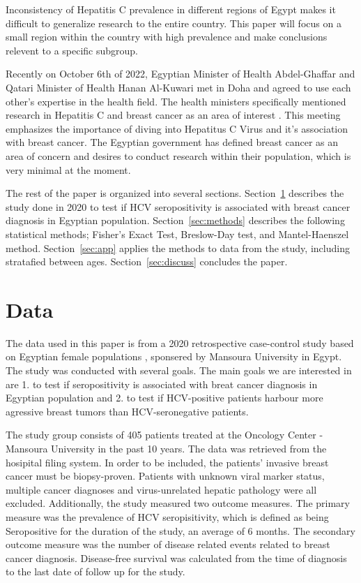 \documentclass[12pt, titlepage]{article}
\begin{document}
Inconsistency of Hepatitis C prevalence in different regions of Egypt makes 
it difficult to generalize research to the entire country. This paper will 
focus on a small region within the country with high 
prevalence \citep{Hussein2021high} and make conclusions relevent to a specific 
subgroup. 

Recently on October 6th of 2022, Egyptian Minister of Health Abdel-Ghaffar and 
Qatari Minister of Health Hanan Al-Kuwari met in Doha and agreed to use each 
other's expertise in the health field. The health ministers specifically mentioned research 
in Hepatitis C and breast cancer as an area of interest \citep{arham2022egypt}. 
This meeting emphasizes the importance of diving into Hepatitus C Virus 
and it's association with breast cancer. The Egyptian government has defined 
breast cancer as an area of concern and desires to conduct research within their 
population, which is very minimal at the moment. 

The rest of the paper is organized into several sections. Section~\ref{sec:data}
describes the study done in 2020 to test if HCV seropositivity is associated with 
breast cancer diagnosis in Egyptian population. Section~\ref{sec:methods} 
describes the following statistical methods; Fisher's Exact Test, Breslow-Day test,
and Mantel-Haenszel method. Section~\ref{sec:app} applies the methods to data 
from the study, including stratafied between ages. Section~\ref{sec:discuss} 
concludes the paper.



\section{Data}
\label{sec:data}

The data used in this paper is from a 2020 retrospective case-control 
study based on Egyptian female populations \citep{hussein2020association},
sponsered by Mansoura University in Egypt. The study was conducted with
several goals. The main goals we are interested in are 1. to test if seropositivity
is associated with breat cancer diagnosis in Egyptian population and 
2. to test if HCV-positive patients harbour more agressive breast tumors 
than HCV-seronegative patients. 

The study group consists of 405 patients treated at the Oncology Center 
- Mansoura University in the past 10 years. The data was retrieved from
the hosipital filing system. In order to be included, the patients'
invasive breast cancer must be biopsy-proven. Patients with unknown 
viral marker status, multiple cancer diagnoses and virus-unrelated 
hepatic pathology were all excluded. Additionally, the study measured
two outcome measures. The primary measure was the prevalence of 
HCV seropisitivity, which is defined as being Seropositive for the duration
of the study, an average of 6 months. The secondary outcome measure was
the number of disease related events related to breast cancer diagnosis. 
Disease-free survival was calculated from the time of diagnosis to the
last date of follow up for the study. 
\end{document}
